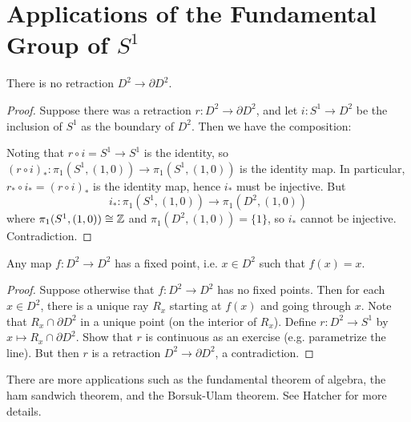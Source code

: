 \section{Applications of the Fundamental Group of \texorpdfstring{$S^1$}{S1}}

\begin{corollary}
  There is no retraction $D^2 \to \partial D^2$.
\end{corollary}

\begin{proof}
  Suppose there was a retraction $r : D^2 \to \partial D^2$,
  and let $i : S^1 \to D^2$ be the inclusion of $S^1$
  as the boundary of $D^2$. Then we have the composition:
  \begin{center}
  \end{center}
    Noting that $r \circ i = S^1 \to S^1$ is the
    identity, so $(r \circ i)_* : \pi_1(S^1, (1, 0)) \to \pi_1(S^1, (1, 0))$
    is the identity map. In particular,
    $r_* \circ i_* = (r \circ i)_*$ is the identity map,
    hence $i_*$ must be injective.
    But
    \[
      i_* : \pi_1(S^1, (1, 0)) \to \pi_1(D^2, (1, 0))
    \]
    where $\pi_1(S^1, (1, 0)) \cong \mathbb{Z}$ and
    $\pi_1(D^2, (1, 0)) = \{1\}$, so $i_*$ cannot be
    injective. Contradiction.
\end{proof}

\begin{corollary}
  Any map $f : D^2 \to D^2$ has a fixed point, i.e.
  $x \in D^2$ such that $f(x) = x$.
\end{corollary}

\begin{proof}
  Suppose otherwise that $f : D^2 \to D^2$ has no fixed
  points.
  Then for each $x \in D^2$, there is a unique ray
  $R_x$ starting at $f(x)$ and going through $x$.
  Note that $R_x \cap \partial D^2$ in a unique point
  (on the interior of $R_x$). Define
  $r : D^2 \to S^1$ by $x \mapsto R_x \cap \partial D^2$.
  Show that $r$ is continuous as an exercise (e.g.
  parametrize the line).
  But then $r$ is a retraction $D^2 \to \partial D^2$,
  a contradiction.
\end{proof}

\begin{remark}
  There are more applications such as the
  fundamental theorem of algebra, the ham sandwich
  theorem, and the Borsuk-Ulam theorem. See Hatcher
  for more details.
\end{remark}

